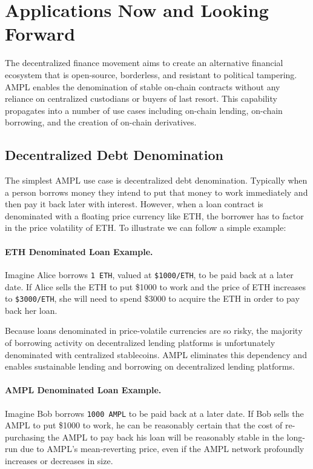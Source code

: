 \documentclass[11pt]{article}
\begin{document}
\section{Applications Now and Looking Forward}

The decentralized finance movement aims to create an alternative financial ecosystem that is
open-source, borderless, and resistant to political tampering. AMPL enables the denomination
of stable on-chain contracts without any reliance on centralized custodians or buyers of last
resort. This capability propagates into a number of use cases including on-chain lending,
on-chain borrowing, and the creation of on-chain derivatives.

\subsection{Decentralized Debt Denomination}

The simplest AMPL use case is decentralized debt denomination. Typically when a person
borrows money they intend to put that money to work immediately and then pay it back later
with interest. However, when a loan contract is denominated with a floating price currency
like ETH, the borrower has to factor in the price volatility of ETH. To illustrate we can
follow a simple example:

\paragraph{ETH Denominated Loan Example.}
Imagine Alice borrows \texttt{1 ETH}, valued at \texttt{\$1000/ETH}, to be paid back at a
later date. If Alice sells the ETH to put \$1000 to work and the price of ETH increases to
\texttt{\$3000/ETH}, she will need to spend \$3000 to acquire the ETH in order to pay back
her loan.

Because loans denominated in price-volatile currencies are so risky, the majority of
borrowing activity on decentralized lending platforms is unfortunately denominated with
centralized stablecoins. AMPL eliminates this dependency and enables sustainable lending and
borrowing on decentralized lending platforms.

\paragraph{AMPL Denominated Loan Example.}
Imagine Bob borrows \texttt{1000 AMPL} to be paid back at a later date. If Bob sells the AMPL
to put \$1000 to work, he can be reasonably certain that the cost of re-purchasing the AMPL to
pay back his loan will be reasonably stable in the long-run due to AMPL's mean-reverting
price, even if the AMPL network profoundly increases or decreases in size.
\end{document}
